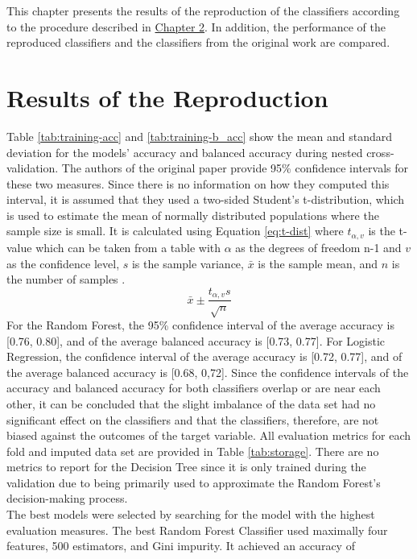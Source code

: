 This chapter presents the results of the reproduction of the classifiers 
according to the procedure described in \hyperref[chap:methods]{Chapter 2}. In 
addition, the performance of the reproduced classifiers and the classifiers 
from the original work \cite{RN127} are compared. 
\section{Results of the Reproduction}
Table \ref{tab:training-acc} and \ref{tab:training-b_acc} show the mean and 
standard deviation for the models' accuracy and balanced accuracy during 
nested cross-validation. The authors of the original paper provide 95\% 
confidence intervals for these two measures. Since there is no information on 
how they computed this interval, it is assumed that they used a two-sided 
Student's t-distribution, which is used to estimate the mean of normally 
distributed populations where the sample size is small. It is calculated using 
Equation \ref{eq:t-dist} where 
$t_{\alpha, v}$ is the t-value which can be taken from a table with $\alpha$ 
as the degrees of freedom n-1 and $v$ as the confidence level, $s$ is the 
sample variance, $\bar{x}$ is the sample mean, and $n$ is the number of samples 
\cite{RN197}.
\begin{equation}
 \bar{x} \pm \frac{t_{\alpha, v}s}{\sqrt{n}}
 \label{eq:t-dist}
\end{equation}
For the Random Forest, the 95\% confidence interval of the average accuracy is 
[0.76, 0.80], and of the average balanced accuracy is [0.73, 0.77]. 
For Logistic Regression, the confidence interval of the average accuracy is 
[0.72, 0.77], and of the average balanced accuracy is [0.68, 0,72]. Since the 
confidence intervals of the accuracy and balanced accuracy for both classifiers 
overlap or are near each other, it can be concluded that the slight imbalance 
of the data set had no significant effect on the classifiers and that the 
classifiers, therefore, are not biased against the outcomes of the target 
variable. All evaluation metrics for each fold and imputed data set are 
provided in Table \ref{tab:storage}. There are no metrics to report for the 
Decision Tree since it is only trained during the validation due to being 
primarily used to approximate the Random Forest's decision-making 
process.
\\
The best models were selected by searching for the model with the highest 
evaluation measures. The best Random Forest Classifier used 
maximally 
four features, 500 estimators, and Gini impurity. It achieved an accuracy of 
